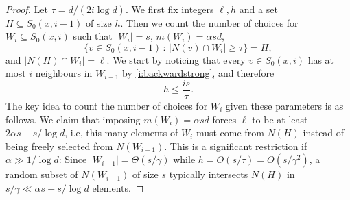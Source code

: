 \documentclass[reqno,a4paper,11pt]{amsart}
\theoremstyle{definition}
\renewcommand{\leq}{\leqslant}
\renewcommand{\geq}{\geqslant}
\begin{document}
\begin{proof}
  Let $\tau = d/(2 i \log d)$.
  We first fix integers $\ell, h$ and a set $H \subseteq S_0(x, i-1)$ of size $h$.
  Then we count the number of choices for $W_i \subseteq S_0(x,i)$ such that $|W_i| = s$, $m(W_i) = \alpha s d$,
  \[
    \{ v \in S_0(x, i-1)\, :\, |N(v) \cap W_i| \geq \tau \} = H, \]
  and $|N(H) \cap W_i| = \ell$.
  We start by noticing that every $v \in S_0(x, i)$ has at most $i$ neighbours in $W_{i-1}$ by \ref{i:backwardstrong}, and therefore
  \begin{equation}\label{eq:boundonh}
    h \leq \frac{is}{\tau}.
  \end{equation}
  The key idea to count the number of choices for $W_i$ given these parameters is as follows.
  We claim that imposing $m(W_i) = \alpha s d$ forces $\ell$ to be at least $2\alpha s - s/\log d$, i.e, this many elements of $W_i$ must come from $N(H)$ instead of being freely selected from $N(W_{i-1})$.
  This is a significant restriction if $\alpha \gg 1/\log d$: Since $|W_{i-1}| = \Theta(s/\gamma)$ while $h = O(s/\tau) = O(s/\gamma^2)$, a random subset of $N(W_{i-1})$ of size $s$ typically intersects $N(H)$ in $s/\gamma \ll \alpha s - s/\log d$ elements.


\end{proof}
\end{document}
